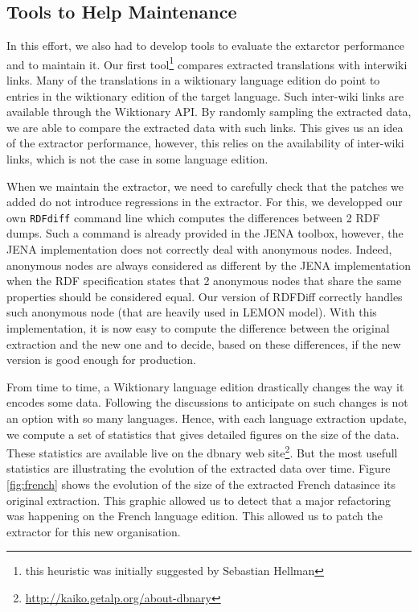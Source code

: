 \documentclass[10pt, a4paper]{article}
\begin{document}
\subsection{Tools to Help Maintenance}

In this effort, we also had to develop tools to evaluate the extarctor performance and to maintain it. Our first tool\footnote{this heuristic was initially suggested by Sebastian Hellman} compares extracted translations with interwiki links. Many of the translations in a wiktionary language edition do point to entries in the wiktionary edition of the target language. Such inter-wiki links are available through the Wiktionary API. By randomly sampling the extracted data, we are able to compare the extracted data with such links. This gives us an idea of the extractor performance, however, this relies on the availability of inter-wiki links, which is not the case in some language edition.

When we maintain the extractor, we need to carefully check that the patches we added do not introduce regressions in the extractor. For this, we developped our own \texttt{RDFdiff} command line which computes the differences between 2 RDF dumps. Such a command is already provided in the JENA toolbox, however, the JENA implementation does not correctly deal with anonymous nodes. Indeed, anonymous nodes are always considered as different by the JENA implementation when the RDF specification states that 2 anonymous nodes that share the same properties should be considered equal. Our version of RDFDiff correctly handles such anonymous node (that are heavily used in LEMON model). With this implementation, it is now easy to compute the difference between the original extraction and the new one and to decide, based on these differences, if the new version is good enough for production.

From time to time, a Wiktionary language edition drastically changes the way it encodes some data. Following the discussions to anticipate on such changes is not an option with so many languages. Hence, with each language extraction update, we compute a set of statistics that gives detailed figures on the size of the data. These statistics are available live on the dbnary web site\footnote{\url{http://kaiko.getalp.org/about-dbnary}}. But the most usefull statistics are illustrating the evolution of the extracted data over time. Figure \ref{fig:french} shows the evolution of the size of the extracted French datasince its original extraction. This graphic allowed us to detect that a major refactoring was happening on the French language edition. This allowed us to patch the extractor for this new organisation.
\end{document}
